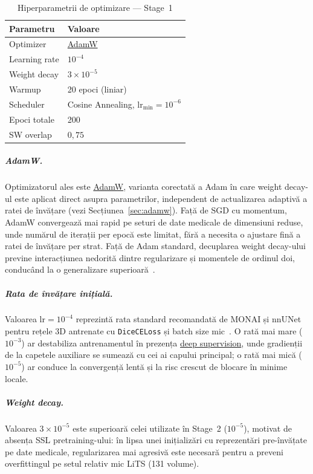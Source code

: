 \documentclass[12pt, a4paper]{report}
\begin{document}
\begin{table}[h!]
  \centering
  \caption{Hiperparametrii de optimizare — Stage~1}
  \label{tab:stage1_optim}
  \begin{tabular}{ll}
    \hline
    \textbf{Parametru} & \textbf{Valoare} \\
    \hline
    Optimizer          & \hyperref[sec:adamw]{AdamW} \\
    Learning rate      & $10^{-4}$ \\
    Weight decay       & $3 \times 10^{-5}$ \\
    Warmup             & 20 epoci (liniar) \\
    Scheduler          & Cosine Annealing, $\text{lr}_{\min} = 10^{-6}$ \\
    Epoci totale       & 200 \\
    SW overlap         & $0{,}75$ \\
    \hline
  \end{tabular}
\end{table}

\subparagraph{AdamW.}
Optimizatorul ales este \hyperref[sec:adamw]{AdamW}, varianta corectată
a Adam în care weight decay-ul este aplicat direct asupra parametrilor,
independent de actualizarea adaptivă a ratei de învățare
(vezi Secțiunea~\ref{sec:adamw}).
Față de SGD cu momentum, AdamW convergează mai rapid pe seturi de date
medicale de dimensiuni reduse, unde numărul de iterații per epocă este
limitat, fără a necesita o ajustare fină a ratei de învățare per strat.
Față de Adam standard, decuplarea weight decay-ului previne interacțiunea
nedorită dintre regularizare și momentele de ordinul doi, conducând la o
generalizare superioară~\cite{loshchilov2019decoupled}.

\subparagraph{Rata de învățare inițială.}
Valoarea $\text{lr} = 10^{-4}$ reprezintă rata standard recomandată
de MONAI și nnUNet pentru rețele 3D antrenate cu \texttt{DiceCELoss}
și batch size mic~\cite{isensee2019automated}.
O rată mai mare ($10^{-3}$) ar destabiliza antrenamentul în prezența
\hyperref[sec:deepsupervision]{deep supervision}, unde gradienții de
la capetele auxiliare se sumează cu cei ai capului principal; o rată
mai mică ($10^{-5}$) ar conduce la convergență lentă și la risc crescut
de blocare în minime locale.

\subparagraph{Weight decay.}
Valoarea $3 \times 10^{-5}$ este superioară celei utilizate în
Stage~2 ($10^{-5}$), motivat de absența SSL pretraining-ului:
în lipsa unei inițializări cu reprezentări pre-învățate pe date
medicale, regularizarea mai agresivă este necesară pentru a preveni
overfittingul pe setul relativ mic LiTS (131 volume).
\end{document}
